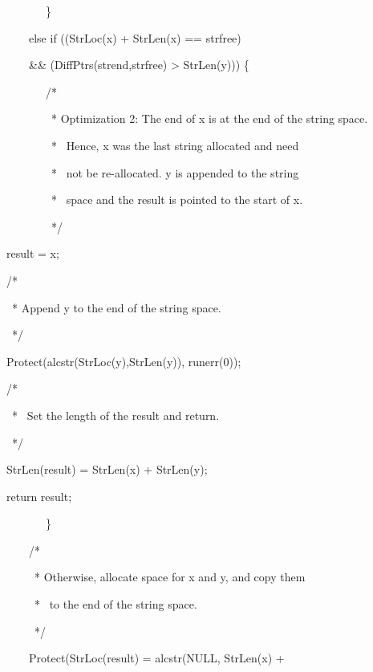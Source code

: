 {\ttfamily\mdseries
\ \ \ \ \ \ \ \ \ \}}

{\ttfamily\mdseries
\ \ \ \ \ \ else if ((StrLoc(x) + StrLen(x) == strfree)}

{\ttfamily\mdseries
\ \ \ \ \ \ \&\& (DiffPtrs(strend,strfree) {\textgreater} StrLen(y))) \{}

{\ttfamily\mdseries
\ \ \ \ \ \ \ \ \ /*}

{\ttfamily\mdseries
\ \ \ \ \ \ \ \ \ \ * Optimization 2: The end of x is at the end of the string space.}

{\ttfamily\mdseries
\ \ \ \ \ \ \ \ \ \ * \ Hence, x was the last string allocated and need}

{\ttfamily\mdseries
\ \ \ \ \ \ \ \ \ \ * \ not be re-allocated. y is appended to the string}

{\ttfamily\mdseries
\ \ \ \ \ \ \ \ \ \ * \ space and the result is pointed to the start of x.}

{\ttfamily\mdseries
\ \ \ \ \ \ \ \ \ \ */}

{\ttfamily\mdseries
\ \  result = x;}

{\ttfamily\mdseries
\ \  /*}

{\ttfamily\mdseries
\ \  \ * Append y to the end of the string space.}

{\ttfamily\mdseries
\ \  \ */}

{\ttfamily\mdseries
\ \  Protect(alcstr(StrLoc(y),StrLen(y)), runerr(0));}

{\ttfamily\mdseries
\ \  /*}

{\ttfamily\mdseries
\ \  \ * \ Set the length of the result and return.}

{\ttfamily\mdseries
\ \  \ */}

{\ttfamily\mdseries
\ \  StrLen(result) = StrLen(x) + StrLen(y);}

{\ttfamily\mdseries
\ \  return result;}

{\ttfamily\mdseries
\ \ \ \ \ \ \ \ \ \}}


\bigskip

{\ttfamily\mdseries
\ \ \ \ \ \ /*}

{\ttfamily\mdseries
\ \ \ \ \ \ \ * Otherwise, allocate space for x and y, and copy them}

{\ttfamily\mdseries
\ \ \ \ \ \ \ * \ to the end of the string space.}

{\ttfamily\mdseries
\ \ \ \ \ \ \ */}

{\ttfamily\mdseries
\ \ \ \ \ \ Protect(StrLoc(result) = alcstr(NULL, StrLen(x) +}

